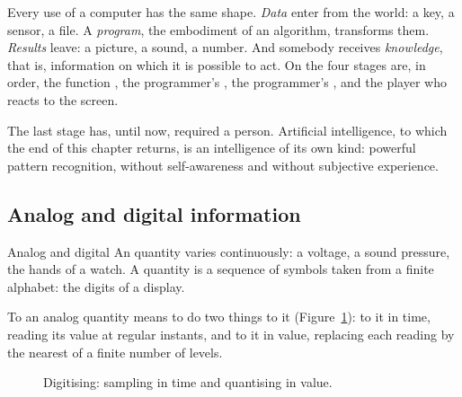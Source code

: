 Every use of a computer has the same shape. \emph{Data} enter from the world:
a key, a sensor, a file. A \emph{program}, the embodiment of an algorithm,
transforms them. \emph{Results} leave: a picture, a sound, a number. And
somebody receives \emph{knowledge}, that is, information on which it is
possible to act. On \prg the four stages are, in order, the function
, the programmer's , the programmer's
, and the player who reacts to the screen.

The last stage has, until now, required a person. Artificial intelligence, to
which the end of this chapter returns, is an intelligence of its own kind:
powerful pattern recognition, without self-awareness and without subjective
experience.

\subsection{Analog and digital information}

\begin{definition}{Analog and digital}
An  quantity varies continuously: a voltage, a sound pressure,
the hands of a watch. A  quantity is a sequence of symbols
taken from a finite alphabet: the digits of a display.
\end{definition}

To  an analog quantity means to do two things to it
(Figure~\ref{fig:info:sampling}): to  it in time, reading its
value at regular instants, and to  it in value, replacing each
reading by the nearest of a finite number of levels.

\begin{figure}[htb]
\centering
{}
\caption{Digitising: sampling in time and quantising in value.}
\label{fig:info:sampling}
\end{figure}

